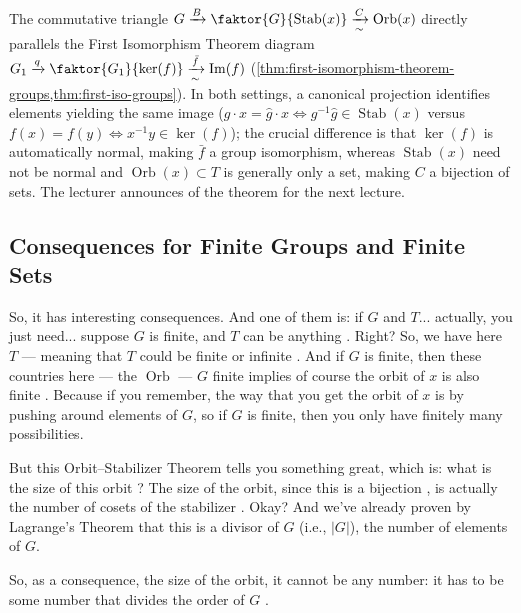 \begin{insight}
The commutative triangle $G \xrightarrow{B} \faktor{G}{\operatorname{Stab}(x)} \xrightarrow[\sim]{C} \operatorname{Orb}(x)$ directly parallels the First Isomorphism Theorem diagram $G_1 \xrightarrow{q} \faktor{G_1}{\ker(f)} \xrightarrow[\sim]{\bar{f}} \operatorname{Im}(f)$ (\cref{thm:first-isomorphism-theorem-groups,thm:first-iso-groups}). In both settings, a canonical projection identifies elements yielding the same image ($g \cdot x = \hat{g} \cdot x \iff g^{-1}\hat{g} \in \operatorname{Stab}(x)$ versus $f(x) = f(y) \iff x^{-1}y \in \ker(f)$); the crucial difference is that $\ker(f)$ is automatically normal, making $\bar{f}$ a group isomorphism, whereas $\operatorname{Stab}(x)$ need not be normal and $\operatorname{Orb}(x) \subset T$ is generally only a set, making $C$ a bijection of sets. The lecturer announces  of the theorem for the next lecture.
\end{insight}

\subsection{Consequences for Finite Groups and Finite Sets}

\begin{speech}[00:36:51 - 00:38:21]
So, it has interesting consequences. And one of them is: if $G$ and $T$... actually, you just need... suppose $G$ is finite, and $T$ can be anything . Right? So, we have here $T$ --- meaning that $T$ could be finite or infinite . And if $G$ is finite, then these countries here --- the $\operatorname{Orb}$ --- $G$ finite implies of course the orbit of $x$ is also finite . Because if you remember, the way that you get the orbit of $x$ is by pushing around elements of $G$, so if $G$ is finite, then you only have finitely many possibilities.

But this Orbit--Stabilizer Theorem tells you something great, which is: what is the size of this orbit ? The size of the orbit, since this is a bijection , is actually the number of cosets of the stabilizer . Okay? And we've already proven by Lagrange's Theorem that this is a divisor of $G$ (i.e., $|G|$), the number of elements of $G$.

So, as a consequence, the size of the orbit, it cannot be any number: it has to be some number that divides the order of $G$ .
\end{speech}


